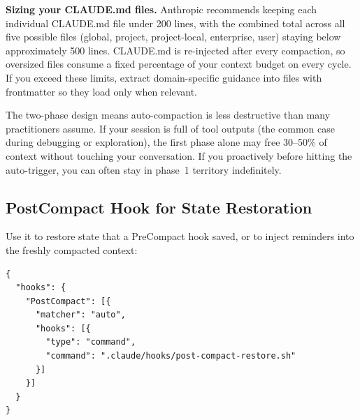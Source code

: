 
\noindent\textbf{Sizing your CLAUDE.md files.}
Anthropic recommends keeping each individual CLAUDE.md file under
200 lines, with the combined total across all five possible
files (global, project, project-local, enterprise, user) staying
below approximately 500 lines. CLAUDE.md is re-injected after every
compaction, so oversized files consume a fixed percentage of your
context budget on every cycle. If you exceed these limits, extract
domain-specific guidance into  files with
 frontmatter so they load only when relevant.

\begin{whybox}
The two-phase design means auto-compaction is less destructive than
many practitioners assume. If your session is full of tool outputs
(the common case during debugging or exploration), the first phase
alone may free 30--50\% of context without touching your conversation.
If you proactively  before hitting the auto-trigger,
you can often stay in phase~1 territory indefinitely.
\end{whybox}

\subsection{PostCompact Hook for State Restoration}
\label{subsec:postcompact-hook}


Use it to restore state that a PreCompact hook saved, or to inject
reminders into the freshly compacted context:

\begin{verbatim}
{
  "hooks": {
    "PostCompact": [{
      "matcher": "auto",
      "hooks": [{
        "type": "command",
        "command": ".claude/hooks/post-compact-restore.sh"
      }]
    }]
  }
}
\end{verbatim}


